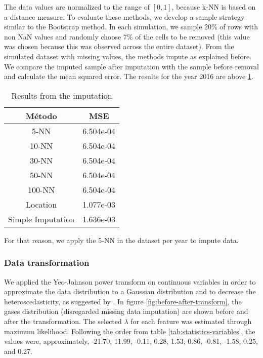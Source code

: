 The data values are normalized to the range of $[0,1]$, because k-NN is based
on a distance measure. To evaluate these methods, we develop a sample strategy
similar to the Bootstrap method. In each simulation, we sample 20\% of rows with
non NaN values and randomly choose 7\% of the cells to be removed (this value
was chosen because this was observed across the entire dataset). From the simulated
dataset with missing values, the methods impute as explained before. We
compare the imputed sample after imputation with the sample before removal and calculate
the mean squared error. The results for the year 2016 are above \ref{tab:result-imputation}. 

\begin{table}[!hb]
    \centering
    \begin{tabular}{|c|c|}
    \hline
    \textbf{Método}   & \textbf{MSE} \\ \hline
    5-NN              & 6.504e-04    \\ \hline
    10-NN             & 6.504e-04    \\ \hline
    30-NN             & 6.504e-04    \\ \hline
    50-NN             & 6.504e-04    \\ \hline
    100-NN            & 6.504e-04    \\ \hline
    Location          & 1.077e-03    \\ \hline
    Simple Imputation & 1.636e-03    \\ \hline
    \end{tabular}
    \caption{Results from the imputation}
    \label{tab:result-imputation}
\end{table}

For that reason, we apply the 5-NN in the dataset per year to impute data. 

\subsubsection{Data transformation}

We applied the Yeo-Johnson power transform \cite{yeo2000} on continuous
variables in order to approximate the data distribution to a Gaussian
distribution and to
decrease the heteroscedasticity, as suggested by \cite{gocheva2014}. In figure
\ref{fig:before-after-transform}, the gases distribution (disregarded
missing data imputation) are shown before and after the transformation. The
selected $\lambda$ for each feature was estimated through maximum likelihood.
Following the order from table \ref{tab:statistics-variables}, the values
were, approximately, 
-21.70,  11.99, -0.11, 0.28, 1.53, 0.86, -0.81, -1.58, 0.25, and 0.27. 

